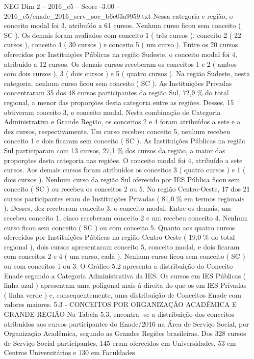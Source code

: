 \begin{textsample}{NEG Dim 2 – 2016\_c5 – Score -3.00 – 2016\_c5/enade\_2016\_serv\_soc\_b6e03a9959.txt}
Nessa categoria e região, o conceito modal foi 3, atribuído a 61 cursos.
Nenhum curso ficou sem conceito ( SC ).
Os demais foram avaliados com conceito 1 ( três cursos ), conceito 2 ( 22 cursos ), conceito 4 ( 30 cursos ) e conceito 5 ( um curso ).
Entre os 20 cursos oferecidos por Instituições Públicas na região Sudeste, o conceito modal foi 4, atribuído a 12 cursos.
Os demais cursos receberam os conceitos 1 e 2 ( ambos com dois cursos ), 3 ( dois cursos ) e 5 ( quatro cursos ).
Na região Sudeste, nesta categoria, nenhum curso ficou sem conceito ( SC ).
As Instituições Privadas concentraram 35 dos 48 cursos participantes da região Sul, 72,9 \% do total regional, a menor das proporções desta categoria entre as regiões.
Desses, 15 obtiveram conceito 3, o conceito modal.
Nesta combinação de Categoria Administrativa e Grande Região, os conceitos 2 e 4 foram atribuídos a sete e a dez cursos, respectivamente.
Um curso recebeu conceito 5, nenhum recebeu conceito 1 e dois ficaram sem conceito ( SC ).
As Instituições Públicas na região Sul participaram com 13 cursos, 27,1 \% dos cursos da região, a maior das proporções desta categoria nas regiões.
O conceito modal foi 4, atribuído a sete cursos.
Aos demais cursos foram atribuídos os conceitos 3 ( quatro cursos ) e 1 ( dois cursos ).
Nenhum curso da região Sul oferecido por IES Pública ficou sem conceito ( SC ) ou recebeu os conceitos 2 ou 5.
Na região Centro-Oeste, 17 dos 21 cursos participantes eram de Instituições Privadas ( 81,0 \% em termos regionais ).
Desses, dez receberam conceito 3, o conceito modal.
Entre os demais, um recebeu conceito 1, cinco receberam conceito 2 e um recebeu conceito 4.
Nenhum curso ficou sem conceito ( SC ) ou com conceito 5.
Quanto aos quatro cursos oferecidos por Instituições Públicas na região Centro-Oeste ( 19,0 \% do total regional ), dois cursos apresentaram conceito 5, conceito modal, e dois ficaram com conceitos 2 e 4 ( um curso, cada ).
Nenhum curso ficou sem conceito ( SC ) ou com conceitos 1 ou 3.
O Gráfico 5.2 apresenta a distribuição do Conceito Enade segundo a Categoria Administrativa da IES.
Os cursos em IES Públicas ( linha azul ) apresentam uma poligonal mais à direita do que os em IES Privadas ( linha verde ) e, consequentemente, uma distribuição de Conceitos Enade com valores maiores. 5.3 - CONCEITOS POR ORGANIZAÇÃO ACADÊMICA E GRANDE REGIÃO Na Tabela 5.3, encontra -se a distribuição dos conceitos atribuídos aos cursos participantes do Enade/2016 na Área de Serviço Social, por Organização Acadêmica, segundo as Grandes Regiões brasileiras.
Dos 328 cursos de Serviço Social participantes, 145 eram oferecidos em Universidades, 53 em Centros Universitários e 130 em Faculdades.

\end{textsample}

